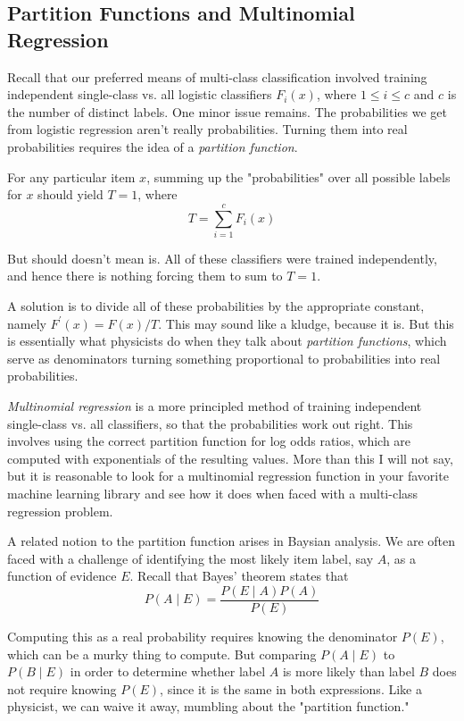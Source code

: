 \documentclass[10pt]{article}
\begin{document}
\subsection{Partition Functions and Multinomial Regression}
Recall that our preferred means of multi-class classification involved training independent single-class vs. all logistic classifiers \(F_{i}(x)\), where \(1 \leq i \leq c\) and \(c\) is the number of distinct labels. One minor issue remains. The probabilities we get from logistic regression aren't really probabilities. Turning them into real probabilities requires the idea of a \emph{partition function}.

For any particular item \(x\), summing up the "probabilities" over all possible labels for \(x\) should yield \(T=1\), where
\[
T=\sum_{i=1}^{c} F_{i}(x)
\]

But should doesn't mean is. All of these classifiers were trained independently, and hence there is nothing forcing them to sum to \(T=1\).

A solution is to divide all of these probabilities by the appropriate constant, namely \(F^{\prime}(x)=F(x) / T\). This may sound like a kludge, because it is. But this is essentially what physicists do when they talk about \emph{partition functions}, which serve as denominators turning something proportional to probabilities into real probabilities.

\emph{Multinomial regression} is a more principled method of training independent single-class vs. all classifiers, so that the probabilities work out right. This involves using the correct partition function for log odds ratios, which are computed with exponentials of the resulting values. More than this I will not say, but it is reasonable to look for a multinomial regression function in your favorite machine learning library and see how it does when faced with a multi-class regression problem.

A related notion to the partition function arises in Baysian analysis. We are often faced with a challenge of identifying the most likely item label, say \(A\), as a function of evidence \(E\). Recall that Bayes' theorem states that
\[
P(A \mid E)=\frac{P(E \mid A) P(A)}{P(E)}
\]

Computing this as a real probability requires knowing the denominator \(P(E)\), which can be a murky thing to compute. But comparing \(P(A \mid E)\) to \(P(B \mid E)\) in order to determine whether label \(A\) is more likely than label \(B\) does not require knowing \(P(E)\), since it is the same in both expressions. Like a physicist, we can waive it away, mumbling about the "partition function."
\end{document}
